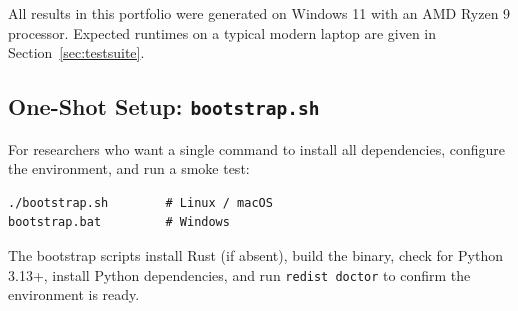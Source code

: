 \noindent All results in this portfolio were generated on Windows 11
with an AMD Ryzen 9 processor.
Expected runtimes on a typical modern laptop are given in
Section~\ref{sec:testsuite}.

\subsection*{One-Shot Setup: \texttt{bootstrap.sh}}

For researchers who want a single command to install all dependencies,
configure the environment, and run a smoke test:

\begin{verbatim}
./bootstrap.sh        # Linux / macOS
bootstrap.bat         # Windows
\end{verbatim}

\noindent The bootstrap scripts install Rust (if absent), build the binary,
check for Python 3.13+, install Python dependencies,
and run \texttt{redist doctor} to confirm the environment is ready.
